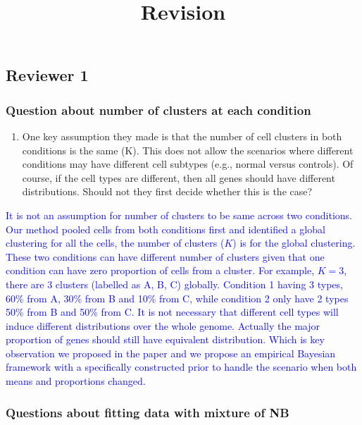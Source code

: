 \documentclass[]{article}
\title{Revision}
\author{}
\date{\vspace{-2.5em}}
\providecommand{\tightlist}{%
  \setlength{\itemsep}{0pt}\setlength{\parskip}{0pt}}
\begin{document}
\maketitle

\subsection{Reviewer 1}\label{reviewer-1}

\subsubsection{Question about number of clusters at each
condition}\label{question-about-number-of-clusters-at-each-condition}

\begin{enumerate}
\def\labelenumi{(\arabic{enumi})}
\tightlist
\item
  One key assumption they made is that the number of cell clusters in
  both conditions is the same (K). This does not allow the scenarios
  where different conditions may have different cell subtypes (e.g.,
  normal versus controls). Of course, if the cell types are different,
  then all genes should have different distributions. Should not they
  first decide whether this is the case?
\end{enumerate}

\textcolor{blue}{It is not an assumption for number of clusters to be same across two conditions. Our method pooled cells from both conditions first and identified a global clustering for all the cells, the number of clusters ($K$) is for the global clustering. These two conditions can have different number of clusters given that one condition can have zero proportion of cells from a cluster.
For example, $K = 3$, there are 3 clusters (labelled as A, B, C) globally. Condition 1 having 3 types, 60\% from A, 30\% from B and 10\% from C, while condition 2 only have 2 types 50\% from B and 50\% from C.}
\textcolor{blue}{It is not necessary that different cell types will induce different distributions over the whole genome. Actually the major proportion of genes should still have equivalent distribution. 
Which is key observation we proposed in the paper and we propose an empirical Bayesian framework with a specifically constructed prior to handle the scenario when both means and proportions changed.}

\subsubsection{Questions about fitting data with mixture of
NB}\label{questions-about-fitting-data-with-mixture-of-nb}
\end{document}
